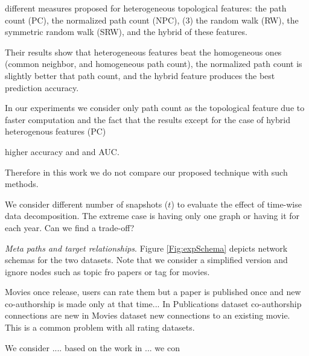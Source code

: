 different measures proposed for heterogeneous topological features: the path count (PC), the normalized path count (NPC), (3) the random walk (RW), the symmetric random walk (SRW), and the hybrid of these features.

Their results show that heterogeneous features beat the homogeneous ones (common neighbor, and homogeneous path count), the normalized path count is slightly better that path count, and the hybrid feature produces the best prediction accuracy.

In our experiments we consider only path count as the topological feature due to faster computation and the fact that the results except for the case of hybrid heterogenous features (PC) 

higher accuracy and and AUC.

\cite{liben2007link}

Therefore in this work we do not compare our proposed technique with such methods.

We consider different number of snapshots ($t$) to evaluate the effect of time-wise data decomposition. The extreme case is having only one graph or having it for each year. Can we find a trade-off?


\textit{Meta paths and target relationships}. Figure \ref{Fig:expSchema} depicts network schemas for the two datasets. Note that we consider a simplified version and ignore nodes such as topic fro papers or tag for movies.


Movies once release, users can rate them but a paper is published once and new co-authorship is made only at that time... In Publications dataset co-authorship connections are new in Movies dataset new connections to an existing movie. This is a common problem with all rating datasets.

We consider .... based on the work in ... we con


